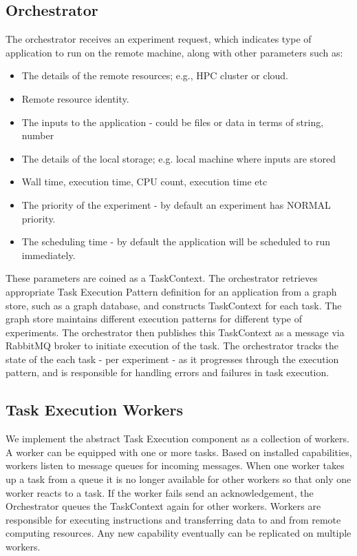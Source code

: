 \documentclass[review]{elsarticle}
\begin{document}
\subsection{Orchestrator}
The orchestrator receives an experiment request, which indicates type of application to run on the remote machine, along with other parameters such as:
\begin{itemize}
\item The details of the remote resources; e.g., HPC cluster or cloud.
\item Remote resource identity.
\item The inputs to the application - could be files or data in terms of string, number
\item The details of the local storage; e.g. local machine where inputs are stored
\item Wall time, execution time, CPU count, execution time etc
\item The priority of the experiment - by default an experiment has NORMAL priority.
\item The scheduling time - by default the application will be scheduled to run immediately.
\end{itemize}
These parameters are coined as a TaskContext. The orchestrator retrieves appropriate Task Execution Pattern definition for an application from a graph store, such as a graph database, and constructs TaskContext for each task. The graph store maintains different execution patterns for different type of experiments. 
The orchestrator then publishes this TaskContext as a message via RabbitMQ broker to initiate execution of the task. The orchestrator tracks the state of the each task - per experiment - as it progresses through the execution pattern, and is responsible for handling errors and failures in task execution.

\subsection{Task Execution Workers}
We implement the abstract Task Execution component as a collection of workers. A worker can be equipped with one or more tasks. Based on installed capabilities, workers listen to message queues for incoming messages. When one worker takes up a task from a queue it is no longer available for other workers so that only one worker reacts to a task. If the worker fails send an acknowledgement, the Orchestrator queues the TaskContext again for other workers. Workers are responsible for executing instructions and transferring data to and from remote computing resources. Any new capability eventually can be replicated on multiple workers. 
\end{document}
